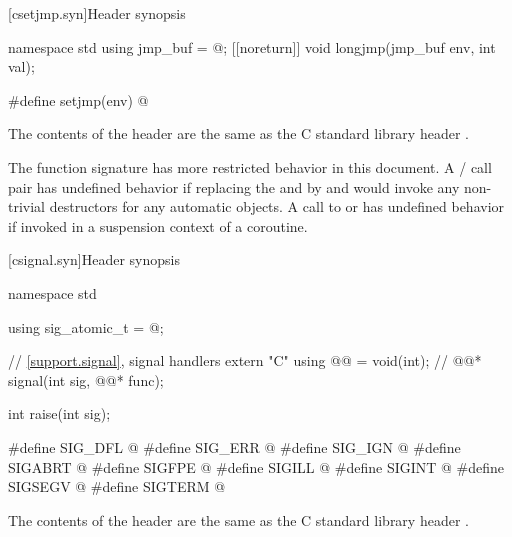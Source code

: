 
[csetjmp.syn]{Header  synopsis}

%
%
%
\begin{codeblock}
namespace std {
  using jmp_buf = @\seebelow@;
  [[noreturn]] void longjmp(jmp_buf env, int val);
}

#define setjmp(env) @\seebelow@
\end{codeblock}

\pnum
The contents of the header  are the same as the C
standard library header .

\pnum
The function signature
%
has more restricted behavior in this document.
A / call pair has undefined
behavior if replacing the  and 
by  and  would invoke any non-trivial destructors for any automatic
objects.
A call to  or  has undefined
behavior if invoked in a suspension context of a coroutine.


[csignal.syn]{Header  synopsis}

%
%
%
%
%
%
%
%
%
%
%
%
\begin{codeblock}
namespace std {
  using sig_atomic_t = @\seebelow@;

  // \ref{support.signal}, signal handlers
  extern "C" using @@ = void(int);  // \expos
  @@* signal(int sig, @@* func);

  int raise(int sig);
}

#define SIG_DFL @\seebelow@
#define SIG_ERR @\seebelow@
#define SIG_IGN @\seebelow@
#define SIGABRT @\seebelow@
#define SIGFPE @\seebelow@
#define SIGILL @\seebelow@
#define SIGINT @\seebelow@
#define SIGSEGV @\seebelow@
#define SIGTERM @\seebelow@
\end{codeblock}

\pnum
The contents of the header  are the same as the C
standard library header .

